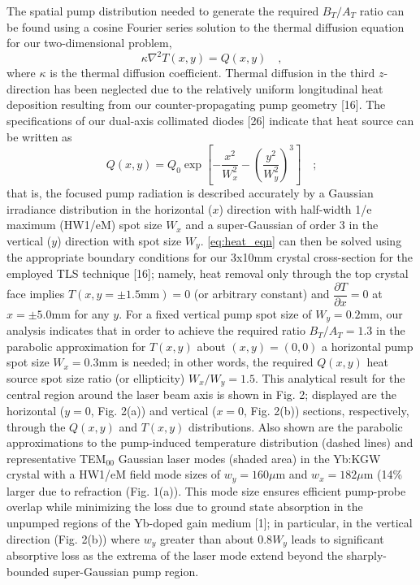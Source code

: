 The spatial pump distribution needed to generate the required $B_T/A_T$ ratio can be found using a cosine Fourier series solution to the thermal diffusion equation for our two-dimensional problem,
\begin{equation} \label{eq:heat_eqn}
  \kappa \nabla^2 T(x,y) = Q(x,y)
  \quad\text{,}
\end{equation}
where $\kappa$ is the thermal diffusion coefficient.
Thermal diffusion in the third $z$-direction has been neglected due to the relatively uniform longitudinal heat deposition resulting from our counter-propagating pump geometry [16].
The specifications of our dual-axis collimated diodes [26] indicate that heat source can be written as
\begin{equation}
  Q(x,y) = Q_0 \exp \left[ - \frac{x^2}{W_x^2} - \left( \frac{y^2}{W_y^2} \right)^3 \right]
  \quad\text{;}
\end{equation}
that is, the focused pump radiation is described accurately by a Gaussian irradiance distribution in the horizontal ($x$) direction with half-width 1/e maximum (HW1/eM) spot size $W_x$ and a super-Gaussian of order 3 in the vertical ($y$) direction with spot size $W_y$.
\ref{eq:heat_eqn} can then be solved using the appropriate boundary conditions for our 3x10mm crystal cross-section for the employed TLS technique [16]; namely, heat removal only through the top crystal face implies $T(x,y = \pm 1.5\text{mm}) = 0$ (or arbitrary constant) and $\dfrac{\partial T}{\partial x} = 0$ at $ x = \pm 5.0$mm for any $y$.
For a fixed vertical pump spot size of $W_y = 0.2$mm, our analysis indicates that in order to achieve the required ratio $B_T / A_T = 1.3$ in the parabolic approximation for $T(x,y)$ about $(x,y) = (0,0)$ a horizontal pump spot size $W_x = 0.3$mm is needed; in other words, the required $Q(x,y)$ heat source spot size ratio (or ellipticity) $W_x / W_y = 1.5$.
This analytical result for the central region around the laser beam axis is shown in Fig. 2; displayed are the
horizontal ($y = 0$, Fig. 2(a)) and vertical ($x = 0$, Fig. 2(b)) sections, respectively, through the $Q(x,y)$ and $T(x,y)$ distributions.
Also shown are the parabolic approximations to the pump-induced temperature distribution (dashed lines) and representative TEM$_{00}$ Gaussian laser modes (shaded area) in the Yb:KGW crystal with a HW1/eM field mode sizes of $w_y = 160\mu$m and $w_x = 182 \mu$m (14\% larger due to refraction (Fig. 1(a)).
This mode size ensures efficient pump-probe overlap while minimizing the loss due to ground state absorption in the unpumped regions of the Yb-doped gain medium [1]; in particular, in the vertical direction (Fig. 2(b)) where $w_y$ greater than about $0.8 W_y$ leads to significant absorptive loss as the extrema of the laser mode extend beyond the sharply-bounded super-Gaussian pump region.

